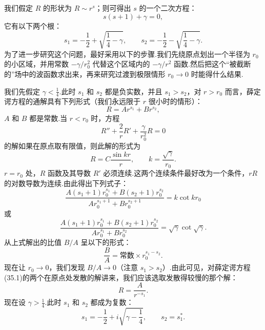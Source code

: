 我们假定 $R$ 的形状为 $R\sim r^s$；则可得出 $s$ 的一个二次方程：
\begin{equation*}
  s(s+1)+\gamma=0,
\end{equation*}
它有以下两个根：
\begin{equation}
  s_1=-\frac{1}{2}+\sqrt{\frac{1}{4}-\gamma},\qquad
  s_2=-\frac{1}{2}-\sqrt{\frac{1}{4}-\gamma}.
\end{equation}
为了进一步研究这个问题，最好采用以下的步骤.我们先绕原点划出一个半径为 $r_0$ 的小区域，并用常数 $-\gamma/r_0^2$ 代替这个区域内的 $-\gamma/r^2$ 函数.然后把这个“被截断的”场中的波函数求出来，再来研究过渡到极限情形 $r_0\to0$ 时能得什么结果.

我们先假定 $\gamma<\frac{1}{4}$.此时 $s_1$ 和 $s_2$ 都是负实数，并且 $s_1>s_2$，对 $r>r_0$ 而言，薛定谔方程的通解具有下列形式（我们永远限于 $r$ 很小时的情形）：
\begin{equation}
  R=Ar^{s_1}+Br^{s_2},
\end{equation}
$A$ 和 $B$ 都是常数.当 $r<r_0$ 时，方程
\begin{equation*}
  R''+\frac{2}{r}R'+\frac{\gamma}{r_0^2}R=0
\end{equation*}
的解如果在原点取有限值，则此解的形式为
\begin{equation}
  R=C\frac{\sin kr}{r},\qquad k=\frac{\sqrt{\gamma}}{r_0}.
\end{equation}
$r=r_0$ 处，$R$ 函数及其导数 $R'$ 必须连续.这两个连续条件最好改为一个条件，$rR$ 的对数导数为连续.由此得出下列式子：
\begin{equation*}
  \frac{A(s_1+1)r_0^{s_1}+B(s_2+1)r_0^{s_2}}
  {Ar_0^{s_1+1}+Br_0^{s_2+1}}=k\cot kr_0
\end{equation*}
或
\begin{equation*}
  \frac{A(s_1+1)r_0^{s_1}+B(s_2+1)r_0^{s_2}}
  {Ar_0^{s_1}+Br_0^{s_2}}=\sqrt{\gamma}\cot\sqrt{\gamma}.
\end{equation*}
从上式解出的比值 $B/A$ 呈以下的形式：
\begin{equation}
  \frac{B}{A}=\text{常数}\times r_0^{s_1-s_2}.
\end{equation}
现在让 $r_0\to0$，我们发现 $B/A\to0$（注意 $s_1>s_2$）.由此可见，对薛定谔方程(35.1)的两个在原点处发散的解讲来，我们应该选取发散得较慢的那个解：
\begin{equation}
  R=\frac{A}{r^{-s_1}}.
\end{equation}
现在设 $\gamma>\frac{1}{4}$.此时 $s_1$ 和 $s_2$ 都成为复数：
\begin{equation*}
  s_1=-\frac{1}{2}+i\sqrt{\gamma-\frac{1}{4}},\qquad s_2=s_1^*.
\end{equation*}
